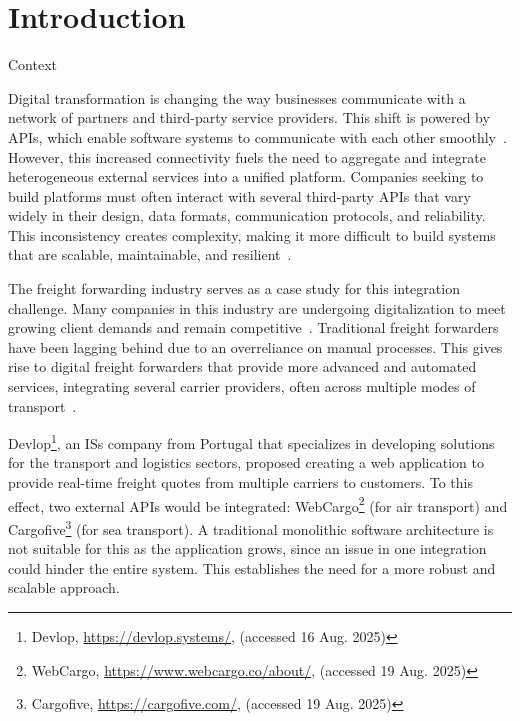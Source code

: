 \documentclass[12pt,reqno, oneside]{amsbook}
\makeatletter
\def\section{\@startsection{section}{1}%
      \z@{.5\linespacing\@plus.7\linespacing}{.25\linespacing}%
      {\normalfont\bfseries\flushleft}}
\theoremstyle{definition}
\theoremstyle{definition}
\numberwithin{section}{chapter}
\numberwithin{table}{chapter}
\numberwithin{figure}{chapter}
\makeatother
\begin{document}
\mainmatter


\setcounter{page}{1} 
\acresetall

\chapter{Introduction}
\label{Chapter:Introduction}

\section{Context}
\label{Section:Context}

Digital transformation is changing the way businesses communicate with a network of partners and third-party service providers. This shift is powered by \acp{API}, which enable software systems to communicate with each other smoothly~\cite{Hunturu2023}. However, this increased connectivity fuels the need to aggregate and integrate heterogeneous external services into a unified platform. Companies seeking to build platforms must often interact with several third-party \acp{API} that vary widely in their design, data formats, communication protocols, and reliability. This inconsistency creates complexity, making it more difficult to build systems that are scalable, maintainable, and resilient~\cite{Huf2019}.

The freight forwarding industry serves as a case study for this integration challenge. Many companies in this industry are undergoing digitalization to meet growing client demands and remain competitive~\cite{Wang2021}. Traditional freight forwarders have been lagging behind due to an overreliance on manual processes. This gives rise to digital freight forwarders that provide more advanced and automated services, integrating several carrier providers, often across multiple modes of transport~\cite{Sullivan2021}.

Devlop\footnote{Devlop, \url{https://devlop.systems/}, (accessed 16 Aug. 2025)}, an \acp{IS} company from Portugal that specializes in developing solutions for the transport and logistics sectors, proposed creating a web application to provide real-time freight quotes from multiple carriers to customers. To this effect, two external \acp{API} would be integrated: WebCargo\footnote{WebCargo, \url{https://www.webcargo.co/about/}, (accessed 19 Aug. 2025)} (for air transport) and Cargofive\footnote{Cargofive, \url{https://cargofive.com/}, (accessed 19 Aug. 2025)} (for sea transport). A traditional monolithic software architecture is not suitable for this as the application grows, since an issue in one integration could hinder the entire system. This establishes the need for a more robust and scalable approach.
\end{document}
